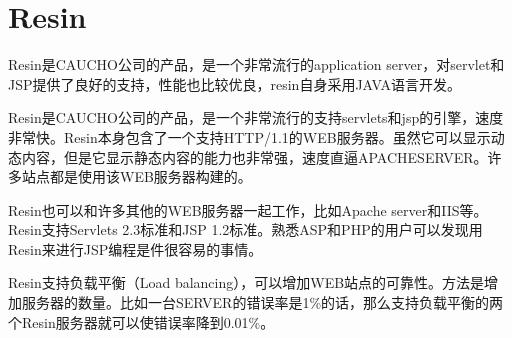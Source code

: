 \section{Resin}
Resin是CAUCHO公司的产品，是一个非常流行的application server，对servlet和JSP提供了良好的支持，性能也比较优良，resin自身采用JAVA语言开发。

Resin是CAUCHO公司的产品，是一个非常流行的支持servlets和jsp的引擎，速度非常快。Resin本身包含了一个支持HTTP/1.1的WEB服务器。虽然它可以显示动态内容，但是它显示静态内容的能力也非常强，速度直逼APACHESERVER。许多站点都是使用该WEB服务器构建的。

Resin也可以和许多其他的WEB服务器一起工作，比如Apache server和IIS等。Resin支持Servlets 2.3标准和JSP 1.2标准。熟悉ASP和PHP的用户可以发现用Resin来进行JSP编程是件很容易的事情。

Resin支持负载平衡（Load balancing），可以增加WEB站点的可靠性。方法是增加服务器的数量。比如一台SERVER的错误率是1\%的话，那么支持负载平衡的两个Resin服务器就可以使错误率降到0.01\%。





